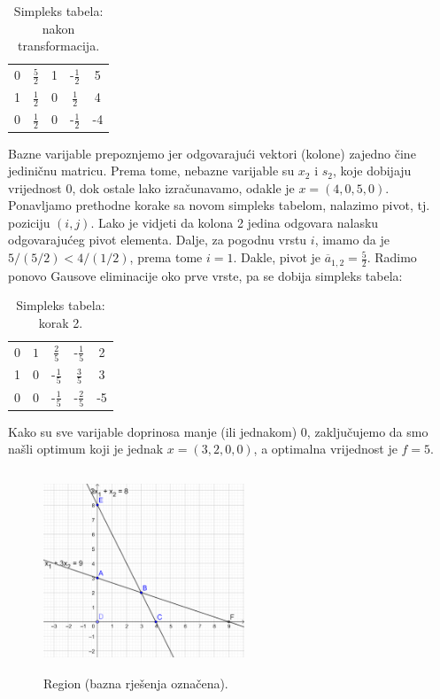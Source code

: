 \documentclass[a4paper, utf8, 11pt, colorlinks]{book}
\begin{document}
  \begin{table}[!ht]
     \centering
     \begin{tabular}{c c c c | c}
         0 &  $\frac{5}{2}$  & 1 & -$\frac{1}{2} $& 5 \\
         1 &  $\frac{1}{2}$ & 0 & $\frac{1}{2}$ & 4 \\ \hline
         0 &  $\frac{1}{2}$ & 0 & -$\frac{1}{2}$ & -4 \\ \hline
     \end{tabular}
     \caption{Simpleks tabela: nakon transformacija.}
     \label{tab:simpleks_tabela2}
 \end{table}
Bazne varijable prepoznjemo jer odgovarajući vektori (kolone) zajedno čine jediničnu matricu. Prema tome, 
 nebazne varijable su $x_2$ i $s_2$, koje dobijaju vrijednost 0, dok ostale lako izračunavamo, odakle je $ x = (4, 0, 5, 0)$. Ponavljamo prethodne korake sa novom simpleks tabelom, nalazimo pivot, tj. poziciju  $(i,j)$. Lako je vidjeti da kolona 2 jedina odgovara nalasku odgovarajućeg pivot elementa. Dalje, za pogodnu vrstu $i$, imamo da je $5 / (5/2) < 4 / (1/2)$, prema tome $i =1$. Dakle, pivot je 
 $\overline{a}_{1,2} = \frac{5}{2}$. Radimo ponovo Gausove eliminacije oko prve vrste, pa se dobija simpleks tabela:
 
   \begin{table}[!ht]
     \centering
     \begin{tabular}{c c c c | c}
         0 &  $1$  & $\frac{2}{5}$             &  -$\frac{1}{5} $ & 2 \\
         1 &  0    &      -$\frac{1}{5}$    & $\frac{3}{5}$    & 3 \\ \hline
         0 &  0    &   -$\frac{1}{5}$       &   -$\frac{2}{5}$   & -5 \\ \hline
     \end{tabular}
     \caption{Simpleks tabela: korak 2.}
     \label{tab:simpleks_tabela3}
 \end{table}
 Kako su sve varijable doprinosa manje (ili jednakom) 0, zaključujemo da smo našli optimum koji je jednak $x = (3, 2, 0, 0)$, a optimalna vrijednost je $f = 5$.
 
 \begin{figure}[!ht]
     \centering
     \includegraphics[width=170pt, height=170pt]{simpleks-region-2.eps}
     \caption{Region (bazna rješenja označena).}
     \label{fig:simplex_region} 
 \end{figure}
 
\end{document}

